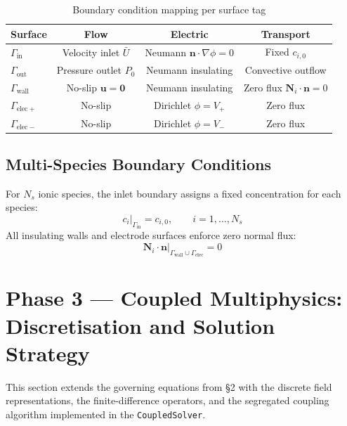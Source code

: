 \documentclass[11pt,a4paper]{article}
\begin{document}
\begin{table}[h]
\centering
\caption{Boundary condition mapping per surface tag}
\begin{tabular}{@{}lccc@{}}
\toprule
Surface            & Flow         & Electric            & Transport \\
\midrule
$\Gamma_{\mathrm{in}}$    & Velocity inlet $\bar{U}$  & Neumann $\bm{n}\!\cdot\!\nabla\phi=0$ & Fixed $c_{i,0}$ \\
$\Gamma_{\mathrm{out}}$   & Pressure outlet $P_0$     & Neumann insulating  & Convective outflow \\
$\Gamma_{\mathrm{wall}}$  & No-slip $\bm{u}=\bm{0}$  & Neumann insulating  & Zero flux $\bm{N}_i\!\cdot\!\bm{n}=0$ \\
$\Gamma_{\mathrm{elec}+}$ & No-slip                   & Dirichlet $\phi=V_+$ & Zero flux \\
$\Gamma_{\mathrm{elec}-}$ & No-slip                   & Dirichlet $\phi=V_-$ & Zero flux \\
\bottomrule
\end{tabular}
\end{table}

\subsection{Multi-Species Boundary Conditions}

For $N_s$ ionic species, the inlet boundary assigns a fixed concentration
for each species:
\begin{equation}\label{eq:bc_species}
  c_i\big|_{\Gamma_{\mathrm{in}}} = c_{i,0}, \qquad i = 1,\ldots,N_s
\end{equation}
All insulating walls and electrode surfaces enforce zero normal flux:
\begin{equation}\label{eq:bc_zero_flux}
  \bm{N}_i \cdot \bm{n}\big|_{\Gamma_{\mathrm{wall}}\cup\Gamma_{\mathrm{elec}}} = 0
\end{equation}

\section{Phase 3 — Coupled Multiphysics: Discretisation and Solution Strategy}
\label{sec:phase3}

This section extends the governing equations from \S2 with the discrete
field representations, the finite-difference operators, and the segregated
coupling algorithm implemented in the \texttt{CoupledSolver}.
\end{document}
